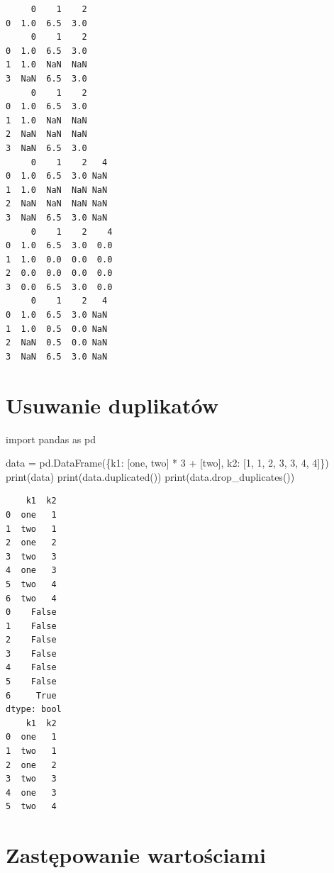 \documentclass[
  polish,
  letterpaper,
  DIV=11,
  numbers=noendperiod]{scrreprt}
\newenvironment{Shaded}{\begin{snugshade}}{\end{snugshade}}
\newcommand{\BuiltInTok}[1]{\textcolor[rgb]{0.00,0.23,0.31}{#1}}
\newcommand{\DecValTok}[1]{\textcolor[rgb]{0.68,0.00,0.00}{#1}}
\newcommand{\ImportTok}[1]{\textcolor[rgb]{0.00,0.46,0.62}{#1}}
\newcommand{\NormalTok}[1]{\textcolor[rgb]{0.00,0.23,0.31}{#1}}
\newcommand{\OperatorTok}[1]{\textcolor[rgb]{0.37,0.37,0.37}{#1}}
\newcommand{\StringTok}[1]{\textcolor[rgb]{0.13,0.47,0.30}{#1}}
\begin{document}
\begin{verbatim}
     0    1    2
0  1.0  6.5  3.0
     0    1    2
0  1.0  6.5  3.0
1  1.0  NaN  NaN
3  NaN  6.5  3.0
     0    1    2
0  1.0  6.5  3.0
1  1.0  NaN  NaN
2  NaN  NaN  NaN
3  NaN  6.5  3.0
     0    1    2   4
0  1.0  6.5  3.0 NaN
1  1.0  NaN  NaN NaN
2  NaN  NaN  NaN NaN
3  NaN  6.5  3.0 NaN
     0    1    2    4
0  1.0  6.5  3.0  0.0
1  1.0  0.0  0.0  0.0
2  0.0  0.0  0.0  0.0
3  0.0  6.5  3.0  0.0
     0    1    2   4
0  1.0  6.5  3.0 NaN
1  1.0  0.5  0.0 NaN
2  NaN  0.5  0.0 NaN
3  NaN  6.5  3.0 NaN
\end{verbatim}

\section{Usuwanie duplikatów}\label{usuwanie-duplikatuxf3w}

\begin{Shaded}
\begin{Highlighting}[]
\ImportTok{import}\NormalTok{ pandas }\ImportTok{as}\NormalTok{ pd}

\NormalTok{data }\OperatorTok{=}\NormalTok{ pd.DataFrame(\{}\StringTok{\textquotesingle{}k1\textquotesingle{}}\NormalTok{: [}\StringTok{\textquotesingle{}one\textquotesingle{}}\NormalTok{, }\StringTok{\textquotesingle{}two\textquotesingle{}}\NormalTok{] }\OperatorTok{*} \DecValTok{3} \OperatorTok{+}\NormalTok{ [}\StringTok{\textquotesingle{}two\textquotesingle{}}\NormalTok{],}
                     \StringTok{\textquotesingle{}k2\textquotesingle{}}\NormalTok{: [}\DecValTok{1}\NormalTok{, }\DecValTok{1}\NormalTok{, }\DecValTok{2}\NormalTok{, }\DecValTok{3}\NormalTok{, }\DecValTok{3}\NormalTok{, }\DecValTok{4}\NormalTok{, }\DecValTok{4}\NormalTok{]\})}
\BuiltInTok{print}\NormalTok{(data)}
\BuiltInTok{print}\NormalTok{(data.duplicated())}
\BuiltInTok{print}\NormalTok{(data.drop\_duplicates())}
\end{Highlighting}
\end{Shaded}

\begin{verbatim}
    k1  k2
0  one   1
1  two   1
2  one   2
3  two   3
4  one   3
5  two   4
6  two   4
0    False
1    False
2    False
3    False
4    False
5    False
6     True
dtype: bool
    k1  k2
0  one   1
1  two   1
2  one   2
3  two   3
4  one   3
5  two   4
\end{verbatim}

\section{Zastępowanie
wartościami}\label{zastux119powanie-wartoux15bciami}
\end{document}
